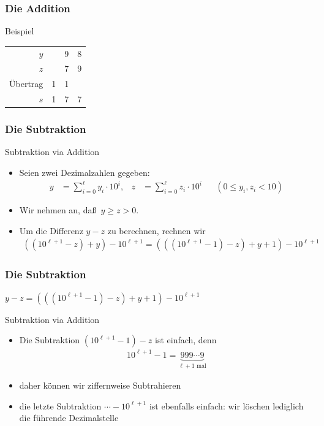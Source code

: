 \documentclass{beamer}
\renewcommand{\emph}[1]{{\textcolor{solarizedRed}{\itshape #1}}}
\newcommand\bc[1]{\left({#1}\right)}
\renewcommand{\oe}{\"o}
\newcommand{\ue}{\"u}
\newcommand{\Ue}{\"U}
\begin{document}
\begin{frame}\frametitle{Die Addition}
\begin{block}{Beispiel}\centering
	\begin{tabular}{r|lll}
		$y$&&9&8\\
		$z$&&7&9\\
		\Ue bertrag&1&1&\\\hline
		$s$&1&7&7
\end{tabular}
\end{block}
\end{frame}

\begin{frame}\frametitle{Die Subtraktion}
\begin{block}{Subtraktion via Addition}
\begin{itemize}
\item Seien zwei Dezimalzahlen gegeben:
	\begin{align*}
		y&=\sum_{i=0}^\ell y_i\cdot 10^i,&
		z&=\sum_{i=0}^\ell z_i\cdot 10^i&&(0\leq y_i,z_i<10)
	\end{align*}
\item Wir nehmen an, da\ss\ $y\geq z>0$.
\item Um die Differenz $y-z$ zu berechnen, rechnen wir
	\begin{align*}
		\bc{(10^{\ell+1}-z)+y}-10^{\ell+1}=\bc{\bc{ (10^{\ell+1}-1)-z }+y+1}-10^{\ell+1}
	\end{align*}
\end{itemize}
\end{block}
\end{frame}

\begin{frame}\frametitle{Die Subtraktion}
	\hfill\emph{$y-z=\bc{\bc{ (10^{\ell+1}-1)-z }+y+1}-10^{\ell+1}$}
	\begin{block}{Subtraktion via Addition}
		\begin{itemize}
			\item Die Subtraktion $ (10^{\ell+1}-1)-z $ ist einfach, denn
				\begin{align*}
					10^{\ell+1}-1=\underbrace{999\cdots 9}_{\mbox{$\ell+1$ mal}}
				\end{align*}
			\item daher k\oe nnen wir ziffernweise Subtrahieren
			\item die letzte Subtraktion $\cdots -10^{\ell+1}$ ist ebenfalls einfach: wir l\oe schen lediglich die f\ue hrende Dezimalstelle
		\end{itemize}
	\end{block}
\end{frame}
\end{document}
